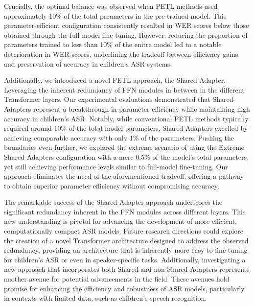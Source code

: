 Crucially, the optimal balance was observed when PETL methods used approximately 10\% of the total parameters in the pre-trained model. This parameter-efficient configuration consistently resulted in WER scores below those obtained through the full-model fine-tuning. However, reducing the proportion of parameters trained to less than 10\% of the enitre model led to a notable deterioration in WER scores, underlining the tradeoff between efficiency gains and preservation of accuracy in children's ASR systems.


Additionally, we introduced a novel PETL approach, the Shared-Adapter. Leveraging the inherent redundancy of FFN modules in between in the different Transformer layers. Our experimental evaluations demonstrated that Shared-Adapters represent a breakthrough in parameter efficiency while maintaining high accuracy in children's ASR. Notably, while conventional PETL methods typically required around 10\% of the total model parameters, Shared-Adapters excelled by achieving comparable accuracy with only 1\% of the parameters. Pushing the boundaries even further, we explored the extreme scenario of using the Extreme Shared-Adapters configuration with a mere 0.5\% of the model's total parameters, yet still achieving performance levels similar to full-model fine-tuning. Our approach eliminates the need of the aforementioned tradeoff, offering a pathway to obtain superior parameter efficiency without compromising accuracy.

The remarkable success of the Shared-Adapter approach underscores the significant redundancy inherent in the FFN modules across different layers. This new understanding is pivotal for advancing the development of more efficient, computationally compact ASR models. Future research directions could explore the creation of a novel Transformer architecture designed to address the observed redundancy, providing an architecture that is inherently more easy to fine-tuning for children's ASR or even in speaker-specific tasks. Additionally, investigating a new approach that incorporates both Shared and non-Shared Adapters represents another avenue for potential advancements in the field. These avenues hold promise for enhancing the efficiency and robustness of ASR models, particularly in contexts with limited data, such as children's speech recognition.